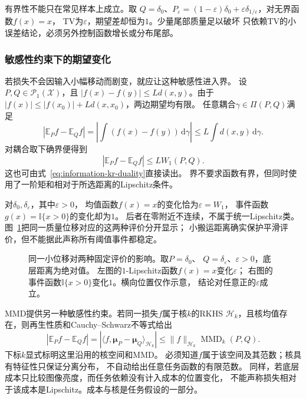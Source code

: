 有界性不能只在常见样本上成立。取
\(Q=\delta_0\)、\(P_\varepsilon=(1-\varepsilon)\delta_0+
\varepsilon\delta_{1/\varepsilon}\)，对无界函数\(f(x)=x\)，
TV为\(\varepsilon\)，期望差却恒为\(1\)。少量尾部质量足以破坏
只依赖TV的小误差结论，必须另外控制函数增长或分布尾部。

\subsubsection{敏感性约束下的期望变化}
\label{sec:information-sensitive-evaluation}

若损失不会因输入小幅移动而剧变，就应让这种敏感性进入界。
设\(P,Q\in\mathcal P_1(\mathcal X)\)，且
\(|f(x)-f(y)|\leq Ld(x,y)\)。由于
\(|f(x)|\leq|f(x_0)|+Ld(x,x_0)\)，两边期望均有限。
任意耦合\(\gamma\in\Pi(P,Q)\)满足
\[
  |\mathbb E_Pf-\mathbb E_Qf|
  =\left|\int(f(x)-f(y))\,\mathrm d\gamma\right|
  \leq L\int d(x,y)\,\mathrm d\gamma.
\]
对耦合取下确界便得到
\[
  |\mathbb E_Pf-\mathbb E_Qf|\leq LW_1(P,Q).
\]
这也可由式~\eqref{eq:information-kr-duality}直接读出。
界不要求函数有界，但同时使用了一阶矩和相对于所选距离的Lipschitz条件。

对\(\delta_0,\delta_\varepsilon\)，其中\(\varepsilon>0\)，
均值函数\(f(x)=x\)的变化恰为\(\varepsilon=W_1\)，
事件函数\(g(x)=\mathbb I\{x>0\}\)的变化却为\(1\)。
后者在零附近不连续，不属于统一Lipschitz类。
图~\ref{fig:information-small-shift-task}把同一质量位移对应的这两种评价分开显示；
小搬运距离确实保护平滑评价，但不能据此声称所有阈值事件都稳定。
\begin{figure}[htbp]
  \centering
  
  \caption{同一小位移对两种固定评价的影响。取\(P=\delta_0\)、
  \(Q=\delta_\varepsilon\)、\(\varepsilon>0\)，底层距离为绝对值。
  左图的\(1\)-Lipschitz函数\(f(x)=x\)变化\(\varepsilon\)；
  右图的事件函数\(\mathbb I\{x>0\}\)变化\(1\)。横向位置仅作示意，
  结论对任意正的\(\varepsilon\)成立。}
  \label{fig:information-small-shift-task}
\end{figure}

MMD提供另一种敏感性约束。若同一损失\(f\)属于核\(k\)的RKHS
\(\mathcal H_k\)，且核均值存在，则再生性质和Cauchy--Schwarz不等式给出
\[
  |\mathbb E_Pf-\mathbb E_Qf|
  =|\langle f,\bm\mu_P-\bm\mu_Q\rangle_{\mathcal H_k}|
  \leq\|f\|_{\mathcal H_k}\operatorname{MMD}_k(P,Q).
\]
下标\(k\)显式标明这里沿用的核空间和MMD。
必须知道\(f\)属于该空间及其范数；核具有特征性只保证分离分布，
不自动给出任意任务函数的有限范数。
同样，若底层成本只比较图像亮度，而任务依赖没有计入成本的位置变化，
不能声称损失相对于该成本是Lipschitz。成本与核是任务假设的一部分。

